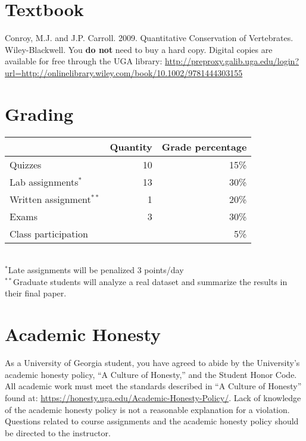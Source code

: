 \documentclass[11pt]{article}
\begin{document}
\vspace{-5mm}
\section*{Textbook}
\vspace{-5mm}
Conroy, M.J. and J.P. Carroll. 2009. Quantitative Conservation of
Vertebrates. Wiley-Blackwell. You {\bf do not} need to buy a hard
copy. Digital copies are available for free through the UGA library:
{\footnotesize \url{http://preproxy.galib.uga.edu/login?url=http://onlinelibrary.wiley.com/book/10.1002/9781444303155}}

\vspace{-5mm}
\section*{Grading}
\vspace{-5mm}
\begin{center}
  \begin{tabular}[h!]{lrr}
    \hline
                              & Quantity & Grade percentage  \\
    \hline
    Quizzes                   & 10       & 15\%              \\
    Lab assignments$^*$       & 13       & 30\%              \\
    Written assignment$^{**}$ & 1        & 20\%              \\
    Exams                     & 3        & 30\%              \\
    Class participation       &          & 5\%               \\
    \hline
  \end{tabular}                                              \\
  \small
\hspace{0mm} $^*$Late assignments will be penalized 3 points/day \\ %
\hspace{0mm} $^{**}$Graduate students will analyze a real dataset and
summarize the results in their final paper.
\end{center}



\vspace{-5mm}
\section*{Academic Honesty}
\vspace{-5mm}
As a University of Georgia student, you have agreed to abide by the
University's academic honesty policy, ``A Culture of Honesty,'' and
the Student Honor Code. All academic work must meet the standards
described in ``A Culture of Honesty'' found at:
\url{https://honesty.uga.edu/Academic-Honesty-Policy/}. Lack of
knowledge of the academic honesty policy is not a reasonable
explanation for a violation. Questions related to course assignments
and the academic honesty policy should be directed to the instructor.
\end{document}
